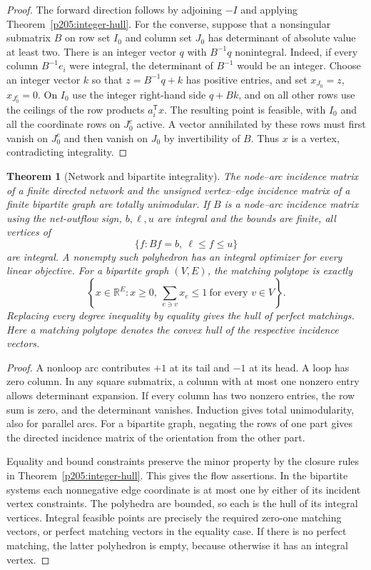 \documentclass[11pt,oneside,openany]{book}
\theoremstyle{plain}
\newtheorem{theorem}{Theorem}[chapter]
\theoremstyle{definition}
\theoremstyle{remark}
\begin{document}
\begin{proof}
The forward direction follows by adjoining \(-I\) and applying
Theorem~\ref{p205:integer-hull}. For the converse, suppose that
a nonsingular submatrix \(B\) on row set \(I_0\) and column set
\(J_0\) has determinant of absolute value at least two. There is
an integer vector \(q\) with \(B^{-1}q\) nonintegral. Indeed, if
every column \(B^{-1}e_i\) were integral, the determinant of
\(B^{-1}\) would be an integer. Choose an integer vector \(k\)
so that \(z=B^{-1}q+k\) has positive entries, and set
\(x_{J_0}=z\), \(x_{J_0^c}=0\). On \(I_0\) use the integer right-hand
side \(q+Bk\), and on all other rows use the ceilings of the
row products \(a_i^{\mathsf T}x\). The resulting point is feasible,
with \(I_0\) and all the coordinate rows on \(J_0^c\) active.
A vector annihilated by these rows must first vanish on \(J_0^c\)
and then vanish on \(J_0\) by invertibility of \(B\). Thus \(x\)
is a vertex, contradicting integrality.
\end{proof}

\begin{theorem}[Network and bipartite integrality]\label{p205:W35}
The node--arc incidence matrix of a finite directed network and the
unsigned vertex--edge incidence matrix of a finite bipartite graph
are totally unimodular. If \(B\) is a node--arc incidence matrix
using the net-outflow sign, \(b,\ell,u\) are integral and the bounds
are finite, all vertices of
\[
             \{f:Bf=b,\ \ell\le f\le u\}
\]
are integral. A nonempty such polyhedron has an integral optimizer
for every linear objective. For a bipartite graph \((V,E)\), the
matching polytope is exactly
\[
 \left\{x\in\mathbb R^E:x\ge0,\
              \sum_{e\ni v}x_e\le1\ \text{for every }v\in V\right\}.
\]
Replacing every degree inequality by equality gives the hull of
perfect matchings. Here a matching polytope denotes the convex
hull of the respective incidence vectors.
\end{theorem}

\begin{proof}
A nonloop arc contributes \(+1\) at its tail and \(-1\) at its
head. A loop has zero column. In any square submatrix, a column
with at most one nonzero entry allows determinant expansion.
If every column has two nonzero entries, the row sum is zero,
and the determinant vanishes. Induction gives total unimodularity,
also for parallel arcs. For a bipartite graph, negating the rows
of one part gives the directed incidence matrix of the
orientation from the other part.

Equality and bound constraints preserve the minor property by
the closure rules in Theorem~\ref{p205:integer-hull}. This gives
the flow assertions. In the bipartite systems each nonnegative
edge coordinate is at most one by either of its incident vertex
constraints. The polyhedra are bounded, so each is the hull of
its integral vertices. Integral feasible points are precisely
the required zero-one matching vectors, or perfect matching
vectors in the equality case. If there is no perfect matching,
the latter polyhedron is empty, because otherwise it has an
integral vertex.
\end{proof}
\end{document}
